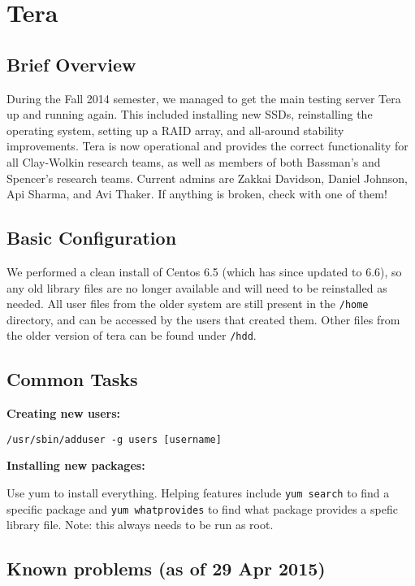 \section{Tera}

\subsection{Brief Overview}

During the Fall 2014 semester, we managed to get the main testing server Tera up and running again. This included installing new SSDs, reinstalling the operating system, setting up a RAID array, and all-around stability improvements. Tera is now operational and provides the correct functionality for all Clay-Wolkin research teams, as well as members of both Bassman's and Spencer's research teams. Current admins are Zakkai Davidson, Daniel Johnson, Api Sharma, and Avi Thaker. If anything is broken, check with one of them!

\subsection{Basic Configuration}

We performed a clean install of Centos 6.5 (which has since updated to 6.6), so any old library files are no longer available and will need to be reinstalled as needed. All user files from the older system are still present in the \texttt{/home} directory, and can be accessed by the users that created them. Other files from the older version of tera can be found under \texttt{/hdd}.

\subsection{Common Tasks}

\textbf{Creating new users:}

\noindent \texttt{/usr/sbin/adduser -g users [username]}



\textbf{Installing new packages:}

\noindent Use yum to install everything. Helping features include \texttt{yum search} to find a specific package and \texttt{yum whatprovides} to find what package provides a spefic library file. Note: this always needs to be run as root.



\subsection{Known problems (as of 29 Apr 2015)}


